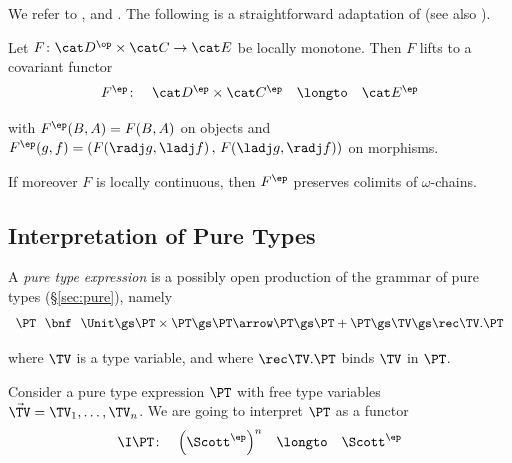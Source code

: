 \noindent
We refer to \cite[Definition 5.2.5]{aj95chapter},
\cite[Definition 7.1.15]{ac98book}
and \cite[Definition 9.1]{streicher06book}.
%
The following is a straightforward adaptation of \cite[Proposition 7.1.19]{ac98book}
(see also \cite[Proposition 5.2.6]{aj95chapter}).

\begin{lemma}
\label{lem:proof:scott:lift}
Let
$F \colon \cat D^\op \times \cat C \to \cat E$
be locally monotone.
Then $F$ lifts to a covariant functor
\[
\begin{array}{*{4}{l}}
  F^\ep \colon
& \cat D^\ep \times \cat C^\ep
& \longto
& \cat E^\ep
\end{array}
\]


\noindent
with $F^\ep(B,A) = F(B,A)$ on objects and
$F^\ep(g,f) = (F(\radj g,\ladj f) \,,\, F(\ladj g,\radj f))$
on morphisms.

If moreover $F$ is locally continuous, then $F^\ep$
preserves colimits of $\omega$-chains.
\end{lemma}



\subsection{Interpretation of Pure Types}

A \emph{pure type expression} is a possibly open production of the
grammar of pure types (\S\ref{sec:pure}), namely
\[
\begin{array}{r @{\ \ }c@{\ \ } l}
    \PT
&   \bnf
&   \Unit
\gs \PT \times \PT
\gs \PT \arrow \PT
\gs \PT + \PT
\gs \TV
\gs \rec \TV.\PT 
\end{array}
\]

\noindent
where $\TV$ is a type variable,
and where $\rec\TV.\PT$ binds $\TV$ in $\PT$.

Consider a pure type expression $\PT$ with free
type variables $\vec \TV = \TV_1,\dots,\TV_n$.
We are going to interpret $\PT$ as a functor
\[
\begin{array}{*{4}{l}}
  \I\PT \colon
& \left( \Scott^\ep \right)^{n}
& \longto
& \Scott^\ep
\end{array}
\]

